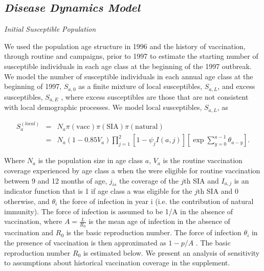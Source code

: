 \subsection{\texorpdfstring{\emph{Disease Dynamics
Model}}{Disease Dynamics Model}}\label{disease-dynamics-model}

\emph{Initial Susceptible Population}

We used the population age structure in 1996 and the history of vaccination, through routine and campaigns, prior to 1997 to estimate the starting number of susceptible individuals in each age class at the beginning of the 1997 outbreak.  We model the number of susceptible individuals in each annual age class at the beginning of 1997, \(S_{a,0}\) as a finite mixture of local susceptibles, \(S_{a,L}\), and excess susceptibles, \(S_{a,E}\) , where excess susceptibles are those that are not consistent with local demographic processes.  We model local susceptibles, \(S_{a,L}\), as 

\[\begin{eqnarray}
S_a^{(local)} &=& N_a \pi(\text{vacc}) \pi(\text{SIA}) \pi(\text{natural}) \\
&=& N_a (1- 0.85 V_a) \prod_{j=1}^2 \left[1- \psi_j I(a,j) \right] \left[\exp \sum_{y=0}^{a-1} \theta_{a-y} \right].
\end{eqnarray}\]

Where \(N_a\) is the population size in age class \(a\), \(V_a\) is the routine vaccination coverage experienced by age class a when the were eligible for routine vaccination between 9 and 12 months of age, \(j_{is}\) the coverage of the \(j\)th SIA and \(I_{a,j}\) is an indicator function that is 1 if age class a was eligible for the \(j\)th SIA and 0 otherwise, and \(\theta_i\) the force of infection in year i (i.e. the contribution of natural immunity).  The force of infection is assumed to be 1/A in the absence of vaccination, where \(A=\frac{L}{R_0}\) \cite{Anderson_1981} is the mean age of infection in the absence of vaccination and \(R_0\) is the basic reproduction number. The force of infection \(\theta_i\) in the presence of vaccination is then approximated as \(1-p/A\) \cite{Anderson_1981}.  The basic reproduction number \(R_0\) is estimated below.  We present an analysis of sensitivity to assumptions about historical vaccination coverage in the supplement.

